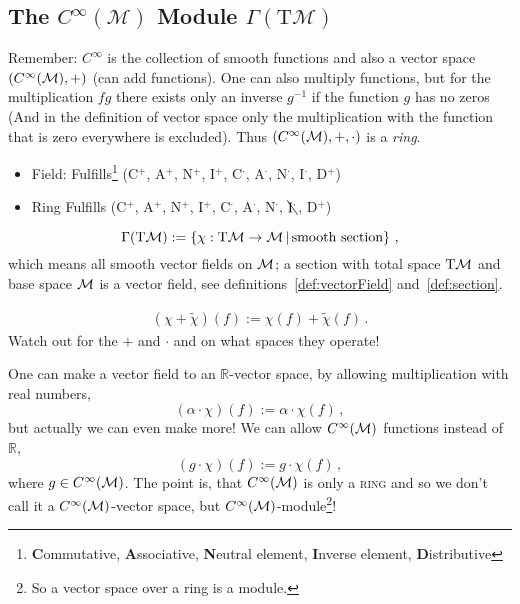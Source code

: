 \documentclass[11pt, a4paper, twocolumn]{article} %
\begin{document}
\subsection[The C infinity module of smooth vector fields]{The $C^\infty(\mathcal{M})$ Module $\Gamma(\mathrm{T}\!\mathcal{M})$}
Remember: $C^\infty$ is the collection of smooth functions and also a vector space $(C^\infty(\mathcal{M}), +)$ (can add functions).
One can also multiply functions, but for the multiplication $fg$ there exists only an inverse $g^{-1}$ if the function
$g$ has no zeros (And in the definition of vector space only the multiplication with the function that is zero everywhere
is excluded). Thus $(C^\infty(\mathcal{M}), +, \cdot)$ is a \textit{ring}.

\begin{itemize}
    \item Field: Fulfills\footnote{\textbf{C}ommutative, \textbf{A}ssociative, \textbf{N}eutral element, \textbf{I}nverse element, \textbf{D}istributive
        } (C$^+$, A$^+$, N$^+$, I$^+$, C$^\cdot$, A$^\cdot$, N$^\cdot$, I$^\cdot$, D$^+$)
    \item Ring Fulfills (C$^+$, A$^+$, N$^+$, I$^+$, C$^\cdot$, A$^\cdot$, N$^\cdot$, $\bcancel{\mathrm{I}^\cdot}$, D$^+$)
\end{itemize}

\begin{equation}
    \Gamma(\T\M) := \left\{ \chi: \T\M\to\M\,|\,\text{smooth section} \right\}\,,
\end{equation}
which means all smooth vector fields on $\mathcal{M}$;
a section with total space $\T\M$ and base space $\mathcal{M}$ is a vector field, see definitions~\ref{def:vectorField}
and~\ref{def:section}.
\begin{defn}
\begin{align}
    (\chi + \tilde{\chi})(f) := \chi(f) + \tilde{\chi}(f)\,.
\end{align}
Watch out for the $+$ and $\cdot$ and on what spaces they operate!
\end{defn}

One can make a vector field to an $\mathbb{R}$-vector space, by allowing multiplication with real numbers,
\begin{equation}
    (\alpha \cdot \chi) (f) := \alpha \cdot \chi(f)\,,
\end{equation}
but actually we can even make more! We can allow $C^\infty(\mathcal{M})$ functions instead of $\mathbb{R}$,
\begin{equation}
    (g \cdot \chi) (f) := g \cdot \chi(f)\,,
\end{equation}
where $g \in C^\infty(\mathcal{M})$. 
The point is, that $C^\infty(\mathcal{M})$ is only a \textsc{ring} and so we don't call it a
$C^\infty(\mathcal{M})$-vector space, but $C^\infty(\mathcal{M})$-module\footnote{So a vector space over a ring is a module.}!
\end{document}
